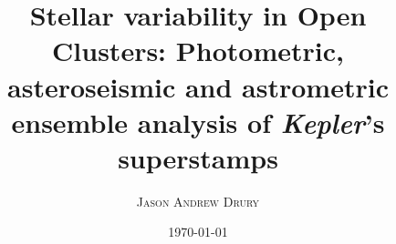 \documentclass[a4paper,twoside,12pt,varwidth]{book}
\makeatletter
\def\cleardoublepage{\clearpage\if@twoside \ifodd\c@page\else
	\hbox{}
	\vspace*{\fill}
	\thispagestyle{empty}
	\newpage
	\if@twocolumn\hbox{}\newpage\fi\fi\fi}
\makeatother
\begin{document}
\author{\textsc{Jason Andrew Drury}}
\title{Stellar variability in Open Clusters: Photometric, asteroseismic and astrometric ensemble analysis of {\it Kepler}'s superstamps}
\date{\textsc{\today}}
\maketitle






\renewcommand{\contentsname}{\textsc{Table of Contents}}
\tableofcontents
\renewcommand{\listfigurename}{\textsc{List of Figures}}
\listoffigures
\renewcommand{\listtablename}{\textsc{List of Tables}}
\listoftables







%
%
%
%
%
%
%
% 

% 

\end{document}
